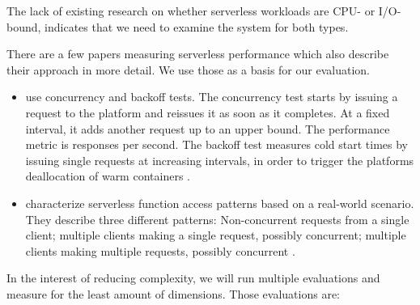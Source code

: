 


The lack of existing research on whether serverless workloads are CPU- or I/O-bound, indicates that we need to examine the system for both types.

There are a few papers measuring serverless performance which also describe their approach in more detail. We use those as a basis for our evaluation.

\begin{itemize}
    \item \citeauthor{McGrath2017} use concurrency and backoff tests. The concurrency test starts by issuing a request to the platform and reissues it as soon as it completes. At a fixed interval, it adds another request up to an upper bound. The performance metric is responses per second. The backoff test measures cold start times by issuing single requests at increasing intervals, in order to trigger the platforms deallocation of warm containers \cite{McGrath2017}.
    \item \citeauthor{Hall2019} characterize serverless function access patterns based on a real-world scenario. They describe three different patterns: Non-concurrent requests from a single client; multiple clients making a single request, possibly concurrent; multiple clients making multiple requests, possibly concurrent \cite{Hall2019}.
\end{itemize}

In the interest of reducing complexity, we will run multiple evaluations and measure for the least amount of dimensions. Those evaluations are:

